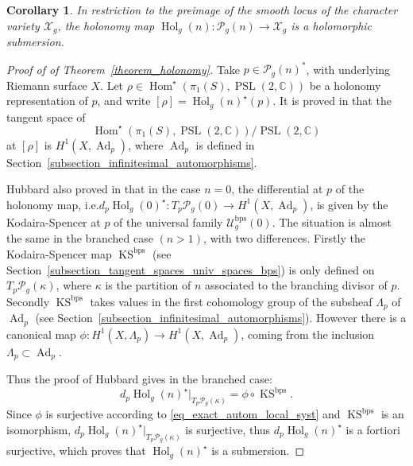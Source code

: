 \documentclass[10pt]{amsart}
\newcommand{\ie}{i.e.}
\newcommand{\C}{\mathbb C}
\newcommand{\BPS}{\mathrm{bps}}
\DeclareMathOperator{\Ad}{Ad}
\DeclareMathOperator{\Hol}{Hol}
\DeclareMathOperator{\Hom}{Hom}
\DeclareMathOperator{\KS}{KS}
\DeclareMathOperator{\PSL}{PSL}
\theoremstyle{definition}
\theoremstyle{plain}
\newtheorem{corollary}[definition]{Corollary}
\begin{document}
\begin{corollary}
In restriction to the preimage of the smooth locus of the character variety $\mathcal X_g$, the holonomy map $\Hol_g(n): \mathcal P_g(n) \to \mathcal X_g$ is a holomorphic submersion.
\end{corollary}

\begin{proof}[Proof of of Theorem~\ref{theorem_holonomy}]

Take $p \in \mathcal P_g(n)^*$, with underlying Riemann surface $X$.
Let $\rho \in \Hom^{\star}(\pi_1(S), \PSL(2, \C))$ be a holonomy representation of $p$, and write $[\rho] = \Hol_g(n)^{\star}(p)$.
It is proved in \cite{hubbard} that the tangent space of
\[
\Hom^{\star}(\pi_1(S), \PSL(2, \C))/\PSL(2, \C)
\]
at $[\rho]$ is $H^1(X, \Ad_p)$, where $\Ad_p$ is defined in Section~\ref{subsection_infinitesimal_automorphisms}.

Hubbard also proved in \cite{hubbard} that in the case $n = 0$, the differential at $p$ of the holonomy map, \ie $d_p\Hol_g(0)^{\star}: T_p \mathcal P_g(0) \to H^1(X, \Ad_p)$, is given by the Kodaira-Spencer at $p$ of the universal family $\mathcal U_g^{\BPS}(0)$.
The situation is almost the same in the branched case $(n > 1)$, with two differences. Firstly the Kodaira-Spencer map $\KS^{\BPS}$ (see Section~\ref{subsection_tangent_spaces_univ_spaces_bps}) is only defined on $T_p\mathcal P_g(\kappa)$, where $\kappa$ is the partition of $n$ associated to the branching divisor of $p$. Secondly $\KS^{\BPS}$ takes values in the first cohomology group of the subsheaf $\Lambda_p$ of $\Ad_p$ (see Section~\ref{subsection_infinitesimal_automorphisms}). However there is a canonical map $\phi: H^1(X, \Lambda_p) \to H^1(X, \Ad_p)$, coming from the inclusion $\Lambda_p \subset \Ad_p$.

Thus the proof of Hubbard gives in the branched case:
\begin{equation*}
d_p\Hol_g(n)^{\star}|_{T_p\mathcal P_g(\kappa)} = \phi \circ \KS^{\BPS}.
\end{equation*}
Since $\phi$ is surjective according to \eqref{eq_exact_autom_local_syst} and $\KS^{\BPS}$ is an isomorphism, $d_p\Hol_g(n)^{\star}|_{T_p\mathcal P_g(\kappa)}$ is surjective, thus $d_p\Hol_g(n)^{\star}$ is a fortiori surjective, which proves that $\Hol_g(n)^{\star}$ is a submersion.
\end{proof}
\end{document}
